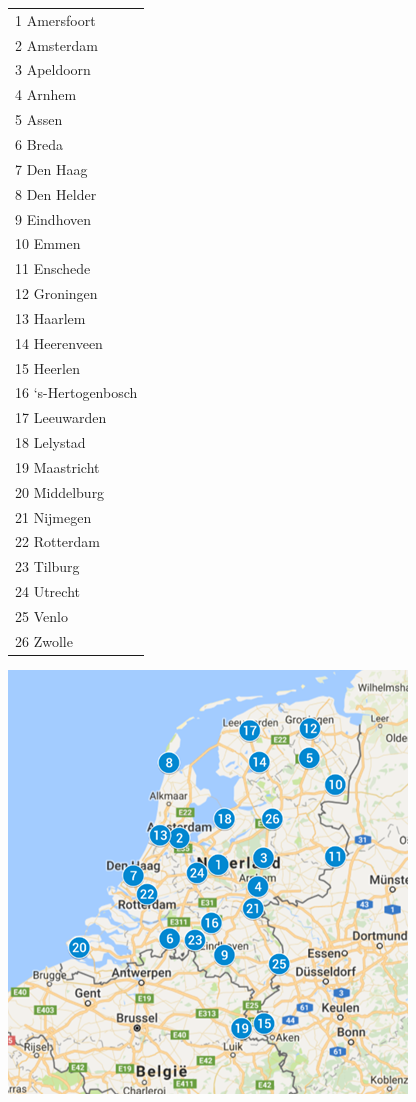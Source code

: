 \begin{table}[ht]
\begin{minipage}[L]{0.2\linewidth}
	\centering
	\begin{tabular}{l}
		1 Amersfoort\\ 
		2 Amsterdam\\
		3 Apeldoorn\\
		4 Arnhem\\
		5 Assen\\
		6 Breda\\
		7 Den Haag\\
		8 Den Helder\\
		9 Eindhoven\\
		10 Emmen\\
		11 Enschede\\
		12 Groningen\\
		13 Haarlem\\
		14 Heerenveen\\
		15 Heerlen\\
		16 ‘s-Hertogenbosch\\
		17 Leeuwarden\\
		18 Lelystad\\
		19 Maastricht\\
		20 Middelburg\\
		21 Nijmegen\\
		22 Rotterdam\\
		23 Tilburg\\
		24 Utrecht\\
		25 Venlo\\
		26 Zwolle
	\end{tabular}
	\label{26cities}
	
\end{minipage}
\hfill
	\begin{minipage}[R]{0.8\linewidth} 
		\centering
			\includegraphics[width=0.8\linewidth, right]{26cities}
		\label{map1}
	\end{minipage}
\end{table}


